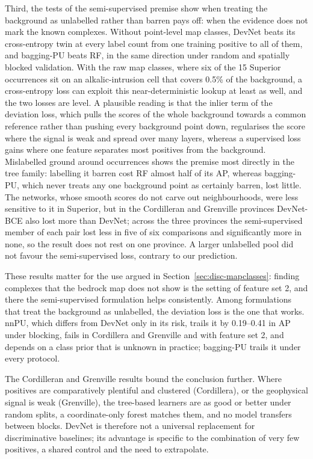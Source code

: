 \documentclass[pdflatex,sn-apa]{sn-jnl}
\begin{document}
Third, the tests of the semi-supervised premise show when treating the background as unlabelled rather than barren pays off: when the evidence does not mark the known complexes. Without point-level map classes, DevNet beats its cross-entropy twin at every label count from one training positive to all of them, and bagging-PU beats RF, in the same direction under random and spatially blocked validation. With the raw map classes, where six of the 15 Superior occurrences sit on an alkalic-intrusion cell that covers 0.5\% of the background, a cross-entropy loss can exploit this near-deterministic lookup at least as well, and the two losses are level. A plausible reading is that the inlier term of the deviation loss, which pulls the scores of the whole background towards a common reference rather than pushing every background point down, regularises the score where the signal is weak and spread over many layers, whereas a supervised loss gains where one feature separates most positives from the background. Mislabelled ground around occurrences shows the premise most directly in the tree family: labelling it barren cost RF almost half of its AP, whereas bagging-PU, which never treats any one background point as certainly barren, lost little. The networks, whose smooth scores do not carve out neighbourhoods, were less sensitive to it in Superior, but in the Cordilleran and Grenville provinces DevNet-BCE also lost more than DevNet; across the three provinces the semi-supervised member of each pair lost less in five of six comparisons and significantly more in none, so the result does not rest on one province. A larger unlabelled pool did not favour the semi-supervised loss, contrary to our prediction.

These results matter for the use argued in Section~\ref{sec:disc-mapclasses}: finding complexes that the bedrock map does not show is the setting of feature set 2, and there the semi-supervised formulation helps consistently. Among formulations that treat the background as unlabelled, the deviation loss is the one that works. nnPU, which differs from DevNet only in its risk, trails it by 0.19--0.41 in AP under blocking, fails in Cordillera and Grenville and with feature set 2, and depends on a class prior that is unknown in practice; bagging-PU trails it under every protocol.

The Cordilleran and Grenville results bound the conclusion further. Where positives are comparatively plentiful and clustered (Cordillera), or the geophysical signal is weak (Grenville), the tree-based learners are as good or better under random splits, a coordinate-only forest matches them, and no model transfers between blocks. DevNet is therefore not a universal replacement for discriminative baselines; its advantage is specific to the combination of very few positives, a shared control and the need to extrapolate.
\end{document}
